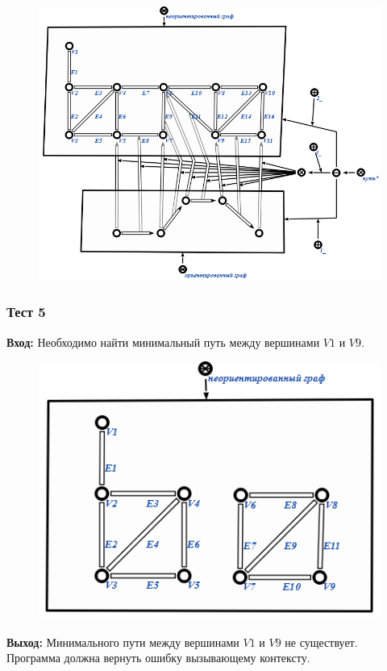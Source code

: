 \begin{figure}[h!]
  \centering
  \includegraphics[scale=0.6]{images/2/test/4_Out}
  \label{fig:Test4_Out}
\end{figure}

\newpage

\subsubsection{Тест 5} 
\textbf{Вход:}
Необходимо найти минимальный путь между вершинами $V1$ и $V9$.

\begin{figure}[h!]
  \centering
  \includegraphics[scale=0.7]{images/2/test/5_In}
  \label{fig:Test5_In}
\end{figure}

 
\textbf{Выход:}
Минимального пути между вершинами $V1$ и $V9$ не существует. Программа должна вернуть ошибку вызывающему контексту.

